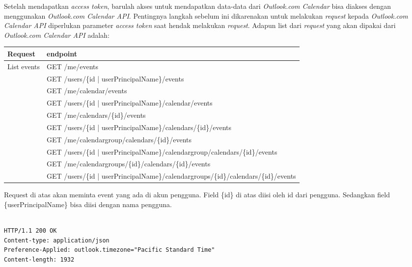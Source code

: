 \begin{description}
Setelah mendapatkan \textit{access token}, barulah akses untuk mendapatkan data-data dari \textit{Outlook.com Calendar} bisa diakses dengan menggunakan \textit{Outlook.com Calendar API}. Pentingnya langkah sebelum ini dikarenakan untuk melakukan \textit{request} kepada \textit{Outlook.com Calendar API} diperlukan parameter \textit{access token} saat hendak melakukan \textit{request}. Adapun list dari \textit{request} yang akan dipakai dari \textit{Outlook.com Calendar API} adalah:

\begin{center}
	\begin{tabular}{|p{5cm}|p{10cm}|}
	\hline
		Request & endpoint\\ \hline 
		List events & GET /me/events\\
		 & GET /users/\{id | userPrincipalName\}/events \\
		 & GET /me/calendar/events\\
		 & GET /users/\{id | userPrincipalName\}/calendar/events\\
		 & GET /me/calendars/\{id\}/events\\
		 & GET /users/\{id | userPrincipalName\}/calendars/\{id\}/events\\
		 & GET /me/calendargroup/calendars/\{id\}/events\\
		 & GET /users/\{id | userPrincipalName\}/calendargroup/calendars/\{id\}/events\\
		 & GET /me/calendargroups/\{id\}/calendars/\{id\}/events\\
		 & GET /users/\{id | userPrincipalName\}/calendargroups/\{id\}/calendars/\{id\}/events\\
	\hline
	\end{tabular}
\end{center} 

Request di atas akan meminta event yang ada di akun pengguna. Field \{id\} di atas diisi oleh id dari pengguna. Sedangkan field \{userPrincipalName\} bisa diisi dengan nama pengguna. 

\begin{lstlisting}[caption={Contoh respon dari request List events diatas},label={lst:atribute-view},language=xml]

HTTP/1.1 200 OK
Content-type: application/json
Preference-Applied: outlook.timezone="Pacific Standard Time"
Content-length: 1932


\end{lstlisting}
\end{description}
